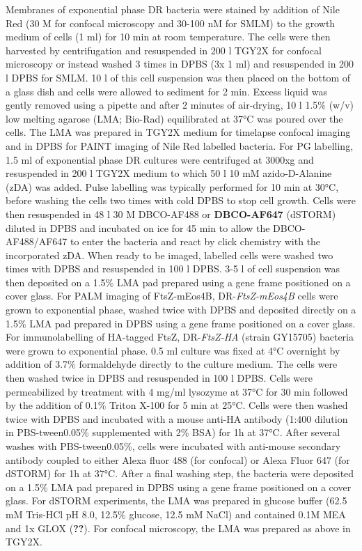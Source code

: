 Membranes of exponential phase DR bacteria were stained by addition of Nile Red (30 \mu{}M for confocal microscopy and 30-100 nM for SMLM) to the growth medium of cells (1 ml) for 10 min at room temperature.
The cells were then harvested by centrifugation and resuspended in 200 \mu{}l TGY2X for confocal microscopy or instead washed 3 times in DPBS (3x 1 ml) and resuspended in 200 \mu{}l DPBS for SMLM.
10 \mu{}l of this cell suspension was then placed on the bottom of a glass dish and cells were allowed to sediment for 2 min.
Excess liquid was gently removed using a pipette and after 2 minutes of air-drying, 10 \mu{}l 1.5\% (w/v) low melting agarose (LMA; Bio-Rad) equilibrated at 37°C was poured over the cells.
The LMA was prepared in TGY2X medium for timelapse confocal imaging and in DPBS for PAINT imaging of Nile Red labelled bacteria.
For PG labelling, 1.5 ml of exponential phase DR cultures were centrifuged at 3000xg and resuspended in 200 \mu{}l TGY2X medium to which 50 \mu{}l 10 mM azido-D-Alanine (zDA) was added.
Pulse labelling was typically performed for 10 min at 30°C, before washing the cells two times with cold DPBS to stop cell growth.
Cells were then resuspended in 48 \mu{}l 30 \mu{}M DBCO-AF488 or \textbf{DBCO-AF647} (dSTORM) diluted in DPBS and incubated on ice for 45 min to allow the DBCO-AF488/AF647 to enter the bacteria and react by click chemistry with the incorporated zDA.
When ready to be imaged, labelled cells were washed two times with DPBS and resuspended in 100 \mu{}l DPBS.
3-5 \mu{}l of cell suspension was then deposited on a 1.5\% LMA pad prepared using a gene frame positioned on a cover glass.
For PALM imaging of FtsZ-mEos4B, DR-\textit{FtsZ-mEos4B} cells were grown to exponential phase, washed twice with DPBS and deposited directly on a 1.5\% LMA pad prepared in DPBS using a gene frame positioned on a cover glass.
For immunolabelling of HA-tagged FtsZ, DR-\textit{FtsZ-HA} (strain GY15705) bacteria were grown to exponential phase.
0.5 ml culture was fixed at 4°C overnight by addition of 3.7\% formaldehyde directly to the culture medium.
The cells were then washed twice in DPBS and resuspended in 100 \mu{}l DPBS.
Cells were permeabilized by treatment with 4 mg/ml lysozyme at 37°C for 30 min followed by the addition of 0.1\% Triton X-100 for 5 min at 25°C.
Cells were then washed twice with DPBS and incubated with a mouse anti-HA antibody (1:400 dilution in PBS-tween0.05\% supplemented with 2\% BSA) for 1h at 37°C.
After several washes with PBS-tween0.05\%, cells were incubated with anti-mouse secondary antibody coupled to either Alexa fluor 488 (for confocal) or Alexa Fluor 647 (for dSTORM) for 1h at 37°C.
After a final washing step, the bacteria were deposited on a 1.5\% LMA pad prepared in DPBS using a gene frame positioned on a cover glass.
For dSTORM experiments, the LMA was prepared in glucose buffer (62.5 mM Tris-HCl pH 8.0, 12.5\% glucose, 12.5 mM NaCl) and contained 0.1M MEA and 1x GLOX (\textbf{??}).
For confocal microscopy, the LMA was prepared as above in TGY2X.

